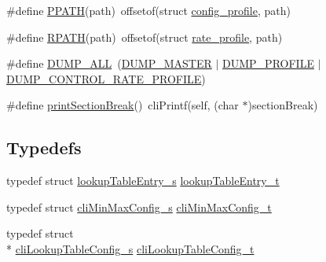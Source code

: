 \begin{DoxyCompactItemize}
\item 
\#define \hyperlink{group__cli_ga1c9812d850ae4b0afb5d4199682c78ad}{P\+P\+A\+T\+H}(path)~offsetof(struct \hyperlink{structconfig__profile}{config\+\_\+profile}, path)
\item 
\#define \hyperlink{group__cli_gaf566f891dbeda217847553afe50b87f2}{R\+P\+A\+T\+H}(path)~offsetof(struct \hyperlink{structrate__profile}{rate\+\_\+profile}, path)
\item 
\#define \hyperlink{group__cli_ga73b8940865f132092459dd3aedd68dec}{D\+U\+M\+P\+\_\+\+A\+L\+L}~(\hyperlink{group__cli_gga88ecb1b6252edb031fcc600625738268a0b4f30d612c9f9ed1437801754eaab90}{D\+U\+M\+P\+\_\+\+M\+A\+S\+T\+E\+R} $\vert$ \hyperlink{group__cli_gga88ecb1b6252edb031fcc600625738268a11a2b583f0abe6a39d1d7c5eac870a4d}{D\+U\+M\+P\+\_\+\+P\+R\+O\+F\+I\+L\+E} $\vert$ \hyperlink{group__cli_gga88ecb1b6252edb031fcc600625738268a2bed9f8bbdff2ebb5946f4743dbf2072}{D\+U\+M\+P\+\_\+\+C\+O\+N\+T\+R\+O\+L\+\_\+\+R\+A\+T\+E\+\_\+\+P\+R\+O\+F\+I\+L\+E})
\item 
\#define \hyperlink{group__cli_gaf94d8ddec998efecfb25aa260fe4ab29}{print\+Section\+Break}()~cli\+Printf(self, (char $\ast$)section\+Break)
\end{DoxyCompactItemize}
\subsection*{Typedefs}
\begin{DoxyCompactItemize}
\item 
typedef struct \hyperlink{structlookupTableEntry__s}{lookup\+Table\+Entry\+\_\+s} \hyperlink{group__cli_ga0fc5e1bf2fbe405aa0607aa7c76c6f28}{lookup\+Table\+Entry\+\_\+t}
\item 
typedef struct \hyperlink{structcliMinMaxConfig__s}{cli\+Min\+Max\+Config\+\_\+s} \hyperlink{group__cli_gab55b8935b3c256b897d3bad997cdbd9b}{cli\+Min\+Max\+Config\+\_\+t}
\item 
typedef struct \\*
\hyperlink{structcliLookupTableConfig__s}{cli\+Lookup\+Table\+Config\+\_\+s} \hyperlink{group__cli_ga93a3507442ae4a3fde4dd71ae572e688}{cli\+Lookup\+Table\+Config\+\_\+t}
\end{DoxyCompactItemize}
